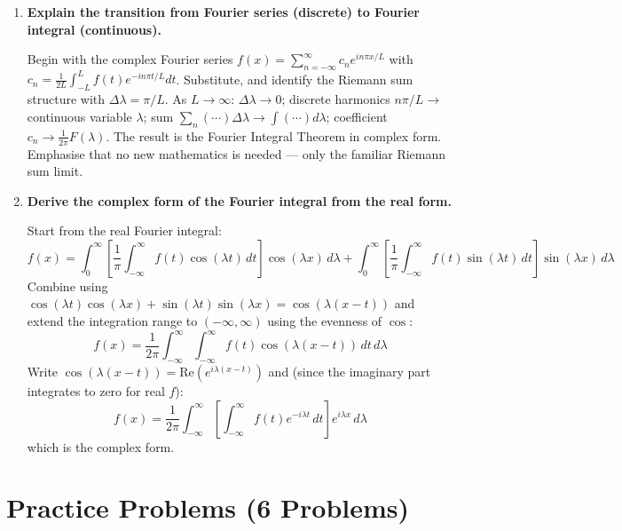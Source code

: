 \documentclass[12pt,a4paper]{article}
\begin{document}
\begin{enumerate}[label=\textbf{\arabic*.}]
\item \textbf{Explain the transition from Fourier series (discrete) to Fourier integral (continuous).}

Begin with the complex Fourier series $f(x)=\sum_{n=-\infty}^{\infty}c_n e^{in\pi x/L}$ with $c_n=\frac{1}{2L}\int_{-L}^{L}f(t)e^{-in\pi t/L}dt$. Substitute, and identify the Riemann sum structure with $\Delta\lambda=\pi/L$. As $L\to\infty$: $\Delta\lambda\to0$; discrete harmonics $n\pi/L\to$ continuous variable $\lambda$; sum $\sum_n(\cdots)\Delta\lambda\to\int(\cdots)d\lambda$; coefficient $c_n\to\frac{1}{2\pi}F(\lambda)$. The result is the Fourier Integral Theorem in complex form. Emphasise that no new mathematics is needed --- only the familiar Riemann sum limit.

\item \textbf{Derive the complex form of the Fourier integral from the real form.}

Start from the real Fourier integral:
\[
f(x) = \int_0^\infty\left[\frac{1}{\pi}\int_{-\infty}^{\infty}f(t)\cos(\lambda t)\,dt\right]\cos(\lambda x)\,d\lambda
       + \int_0^\infty\left[\frac{1}{\pi}\int_{-\infty}^{\infty}f(t)\sin(\lambda t)\,dt\right]\sin(\lambda x)\,d\lambda
\]
Combine using $\cos(\lambda t)\cos(\lambda x)+\sin(\lambda t)\sin(\lambda x)=\cos(\lambda(x-t))$ and extend the integration range to $(-\infty,\infty)$ using the evenness of $\cos$:
\[
f(x) = \frac{1}{2\pi}\int_{-\infty}^{\infty}\int_{-\infty}^{\infty}f(t)\cos(\lambda(x-t))\,dt\,d\lambda
\]
Write $\cos(\lambda(x-t)) = \mathrm{Re}(e^{i\lambda(x-t)})$ and (since the imaginary part integrates to zero for real $f$):
\[
f(x) = \frac{1}{2\pi}\int_{-\infty}^{\infty}\left[\int_{-\infty}^{\infty}f(t)e^{-i\lambda t}\,dt\right]e^{i\lambda x}\,d\lambda
\]
which is the complex form.

\end{enumerate}

\section{Practice Problems (6 Problems)}
\end{document}
